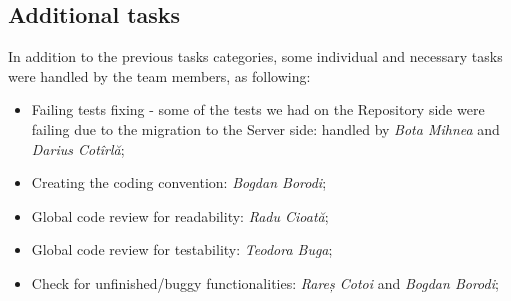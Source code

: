 \documentclass[9pt,a4paper,twocolumn,twoside]{tau-class/tau}
\begin{document}
\subsection{Additional tasks}
In addition to the previous tasks categories, some individual and necessary tasks were handled by the team members, as following:
\begin{itemize}
    \item Failing tests fixing - some of the tests we had on the Repository side were failing due to the migration to the Server side: handled by \textit{Bota Mihnea} and \textit{Darius Cotîrlă};
    \item Creating the coding convention: \textit{Bogdan Borodi}; 
    \item Global code review for readability: \textit{Radu Cioată};
    \item Global code review for testability: \textit{Teodora Buga};
    \item Check for unfinished/buggy functionalities: \textit{Rareș Cotoi} and \textit{Bogdan Borodi};
\end{itemize}
\end{document}
